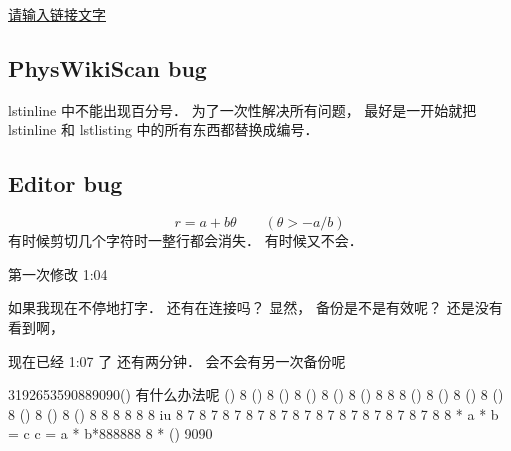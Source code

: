 

\href{http://www.example.com}{请输入链接文字}

\subsection{PhysWikiScan bug}
lstinline 中不能出现百分号． 为了一次性解决所有问题， 最好是一开始就把 lstinline 和 lstlisting 中的所有东西都替换成编号．

\subsection{Editor bug}
\begin{equation}
r = a + b\theta \qquad (\theta > -a/b)
\end{equation}
有时候剪切几个字符时一整行都会消失． 有时候又不会．

第一次修改 1:04

如果我现在不停地打字． 还有在连接吗？ 显然， 备份是不是有效呢？
还是没有看到啊， 

现在已经 1:07 了
还有两分钟． 会不会有另一次备份呢

3192653590889090() 有什么办法呢 () 8 () 8 () 8 () 8 () 8 () 8 8 8 () 8 () 8 () 8 () 8 () 8 () 8 () 8 8 8 8 8 8 iu 8 7 8 7 8 7 8 7 8 7 8 7 8 7 8 7 8 7 8 7 8 7 8 8 * a * b = c c = a * b*888888    8 * () 9090
